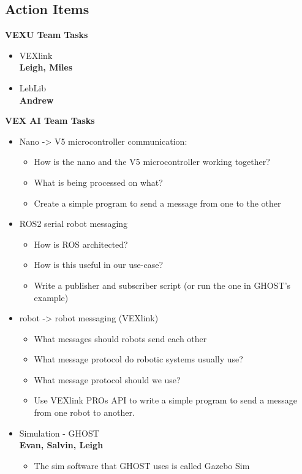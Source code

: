 \subsection{Action Items}
\textbf{VEXU Team Tasks}
\begin{itemize}
  \item VEXlink\\
  \textbf{Leigh, Miles}
  \item LebLib\\
  \textbf{Andrew}
\end{itemize}

\textbf{VEX AI Team Tasks}
\begin{itemize}
  \item Nano -> V5 microcontroller communication:
  \begin{itemize}
      \item How is the nano and the V5 microcontroller working together?
      \item What is being processed on what?
      \item Create a simple program to send a message from one to the other
  \end{itemize}
  \item ROS2 serial robot messaging
  \begin{itemize}
      \item How is ROS architected?
      \item How is this useful in our use-case?
      \item Write a publisher and subscriber script (or run the one in GHOST's example)
  \end{itemize}
  \item robot -> robot messaging (VEXlink)
  \begin{itemize}
      \item What messages should robots send each other
      \item What message protocol do robotic systems usually use?
      \item What message protocol should we use?
      \item Use VEXlink PROs API to write a simple program to send a message from one robot to another.
  \end{itemize}
  \item Simulation - GHOST\\
  \textbf{Evan, Salvin, Leigh}
  \begin{itemize}
      \item The sim software that GHOST uses is called Gazebo Sim

\end{itemize}
\end{itemize}
